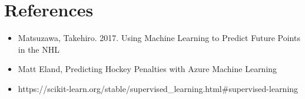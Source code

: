 \documentclass{report}
\begin{document}
	\section{References}
		\begin{itemize}
			\item Matsuzawa, Takehiro. 2017. Using Machine Learning to Predict Future Points in the NHL
			\item Matt Eland, Predicting Hockey Penalties with Azure Machine Learning
			\item https://scikit-learn.org/stable/supervised_learning.html#supervised-learning
		\end{itemize}
\end{document}
